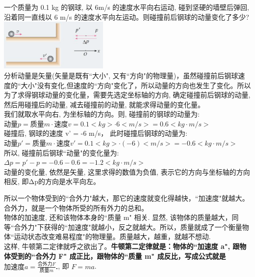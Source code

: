 \documentclass[UTF8]{ctexart}
\begin{document}
\begin{myEnvSample}
	一个质量为 0.1 kg 的钢球, 以 6m/s 的速度水平向右运动, 碰到坚硬的墙壁后弹回,沿着同一直线以 6 m/s 的速度水平向左运动。则碰撞前后钢球的动量变化了多少? \\

\includegraphics[width=0.4\textwidth]{img/0104.png} \\	

分析动量是矢量(矢量是既有``大小", 又有``方向"的物理量)，虽然碰撞前后钢球速度的``大小"没有变化,但速度的``方向"变化了，所以动量的方向也发生了变化。所以为了求得钢球动量的变化量，需要先选定坐标轴的方向, 确定碰撞前后钢球的动量, 然后用碰撞后的动量, 减去碰撞前的动量, 就能求得动量的变化量。\\

我们就取水平向右, 为坐标轴的方向。则, 碰撞前的钢球的动量为: \\
$\text{动量}p=\text{质量}m\cdot \text{速度}v=0.1<kg>\cdot 6<m/s>=0.6<kg·m/s>	$ \\

碰撞后, 钢球的速度 v' = -6 m/s， 此时碰撞后钢球的动量为: \\
$\text{动量}p'=\text{质量}m\cdot \text{速度}v'=0.1<kg>\cdot (-6)<m/s>= -0.6<kg·m/s>	$ \\

所以, 碰撞前后钢球``动量"的变化量为: \\
$\varDelta p=p'-p=-0.6-0.6=-1.2<kg·m/s>$ \\

动量的变化量, 依然是矢量, 这里求得的数值为负值, 表示它的方向与坐标轴的方向相反, 即Δp的方向是水平向左。	
\end{myEnvSample}


所以一个物体受到的``合外力"越大，那它的速度就变化得越快，``加速度"就越大。 合外力，就是一个物体所受的所有外力的总和。 \\
物体的加速度, 还和该物体本身的``质量 m" 相关. 显然, 该物体的质量越大，同等``合外力"下获得的``加速度"就越小，反之就越大。所以，质量就成了一个衡量物体``运动状态改变难易程度"的物理量。质量越大，越重，就越不想动.\\
这样, 牛顿第二定律就呼之欲出了。\textbf{牛顿第二定律就是：物体的``加速度 a",  跟物体受到的``合外力 F" 成正比，跟物体的``质量 m" 成反比，写成公式就是 $\text{加速度}a=\frac{\text{合外力}F}{\text{质量}m}$.}, 即 $F=ma$. \\
\end{document}
